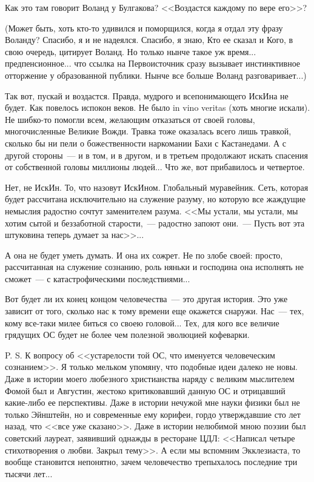 \documentclass{scrbook}
\newcommand{\flqq}{<<}
\newcommand{\frqq}{>>}
\newcommand{\mdash}{~--- }
\newcommand{\commamdash}{~--- } %
\begin{document}
Как это там говорит Воланд у Булгакова? {\flqq}Воздастся каждому по вере его{\frqq}?

(Может быть, хоть кто-то удивился и поморщился, когда я отдал эту фразу Воланду? Спасибо, я и не надеялся. Спасибо, я знаю, Кто ее сказал и Кого, в свою очередь, цитирует Воланд. Но только нынче такое уж время... предпенсионное... что ссылка на Первоисточник сразу вызывает инстинктивное отторжение у образованной публики. Нынче все больше Воланд разговаривает...)

Так вот, пускай и воздастся. Правда, мудрого и всепонимающего ИскИна не будет. Как повелось испокон веков. Не было in vino veritas (хоть многие искали). Не шибко-то помогли всем, желающим отказаться от своей головы, многочисленные Великие Вожди. Травка тоже оказалась всего лишь травкой, сколько бы ни пели о божественности наркомании Бахи с Кастанедами. А с другой стороны{\mdash}и в том, и в другом, и в третьем продолжают искать спасения от собственной головы миллионы людей... Что же, вот прибавилось и четвертое.

Нет, не ИскИн. То, что назовут ИскИном. Глобальный муравейник. Сеть, которая будет рассчитана исключительно на служение разуму, но которую все жаждущие немыслия радостно сочтут заменителем разума. {\flqq}Мы устали, мы устали, мы хотим сытой и беззаботной старости,{\commamdash}радостно запоют они.{\mdash}Пусть вот эта штуковина теперь думает за нас{\frqq}...

А она не будет уметь думать. И она их сожрет. Не по злобе своей: просто, рассчитанная на служение сознанию, роль няньки и господина она исполнять не сможет{\mdash}с катастрофическими последствиями...

Вот будет ли их конец концом человечества{\mdash}это другая история. Это уже зависит от того, сколько нас к тому времени еще окажется снаружи. Нас{\mdash}тех, кому все-таки милее биться со своею головой... Тех, для кого все величие грядущих ОС будет не более чем полезной эволюцией кофеварки.

P. S. К вопросу об {\flqq}устарелости той ОС, что именуется человеческим сознанием{\frqq}. Я только мельком упомяну, что подобные идеи далеко не новы. Даже в истории моего любезного христианства наряду с великим мыслителем Фомой был и Августин, жестоко критиковавший данную ОС и отрицавший какие-либо ее перспективы. Даже в истории нечужой мне науки физики был не только Эйнштейн, но и современные ему корифеи, гордо утверждавшие сто лет назад, что {\flqq}все уже сказано{\frqq}. Даже в истории нелюбимой мною поэзии был советский лауреат, заявивший однажды в ресторане ЦДЛ: {\flqq}Написал четыре стихотворения о любви. Закрыл тему{\frqq}. А если мы вспомним Экклезиаста, то вообще становится непонятно, зачем человечество трепыхалось последние три тысячи лет...
\end{document}
